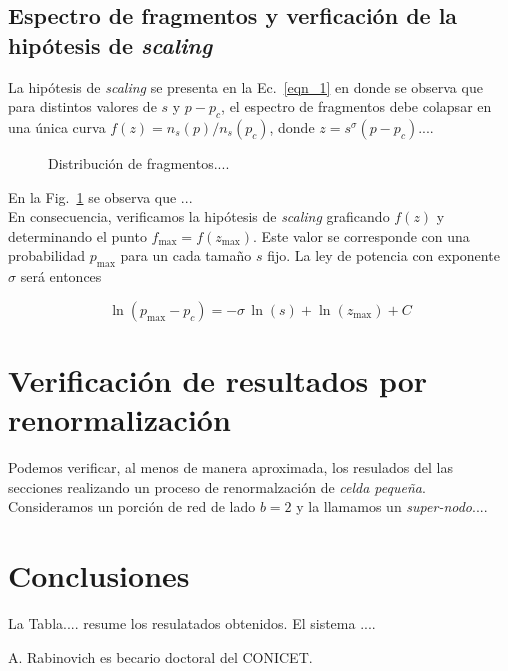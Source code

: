 \documentclass[%
 reprint,
 amsmath,amssymb,
 aps,
spanish]{revtex4-1}
\begin{document}
\subsection{\label{S} Espectro de fragmentos y verficaci\'on de la hip\'otesis de \emph{scaling} }

La hip\'otesis de \emph{scaling} se presenta en la Ec.~\ref{eqn_1} en donde se observa que para distintos valores de $s$ y $p-p_c$, el espectro de fragmentos debe colapsar en una \'unica curva $f(z)=n_s(p)/n_s(p_c)$, donde $z=s^\sigma(p-p_c)$.... 

\begin{figure}[b]
\begin{center}
\caption{Distribuci\'on de fragmentos.... }\label{fig_1}
\end{center}
\end{figure}

En la Fig.~\ref{fig_1} se observa que ... \\


En consecuencia, verificamos la hip\'otesis de \emph{scaling} graficando $f(z)$  y determinando el punto $f_\mathrm{max}=f(z_\mathrm{max})$. Este valor se corresponde con una probabilidad $p_\mathrm{max}$ para un cada tama\~no $s$ fijo. La ley de potencia con exponente $\sigma$ ser\'a entonces

 
\begin{equation}
\ln(p_\mathrm{max}-p_c)=-\sigma\,\ln(s)+\ln(z_\mathrm{max})+C\label{eqn_3}
\end{equation}


\section{\label{R} Verificaci\'on de resultados por renormalizaci\'on}

Podemos verificar, al menos de manera aproximada, los resulados del las secciones realizando un proceso de renormalzaci\'on de \emph{celda peque\~na}. Consideramos un porci\'on de red de lado $b=2$ y la llamamos un \emph{super-nodo}....

\section{\label{conclusions}Conclusiones}

La Tabla.... resume los resulatados obtenidos. El sistema ....


\begin{acknowledgments}
A. Rabinovich es becario doctoral del CONICET. 
\end{acknowledgments}

\appendix
\end{document}
